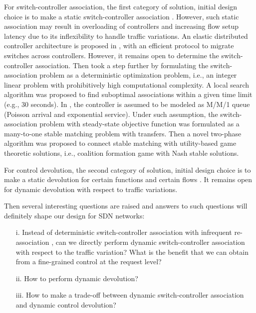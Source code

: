 \documentclass[10pt,journal,compsoc]{IEEEtran}
\begin{document}
For switch-controller association, the first category of solution, initial design choice is to make a static switch-controller association \cite{koponen2010onix} \cite{tootoonchian2010hyperflow}. However, such static association may result in overloading of controllers and increasing flow setup latency due to its inflexibility to handle traffic variations. An elastic distributed controller architecture is proposed in \cite{dixit2013towards}, with an efficient protocol to migrate switches across controllers. However, it remains open to determine the switch-controller association. Then \cite{krishnamurthy2014pratyaastha} took a step further by formulating the switch-association problem as a deterministic optimization problem, i.e., an integer linear problem with prohibitively high computational complexity. A local search algorithm was proposed to find suboptimal associations within a given time limit (e.g., 30 seconds). In \cite{wang2016dynamic}, the controller is assumed to be modeled as M/M/1 queue (Poisson arrival and exponential service). Under such assumption, the switch-association problem with steady-state objective function was formulated as a many-to-one stable matching problem with transfers. Then a novel two-phase algorithm was proposed to connect stable matching with utility-based game theoretic solutions, i.e., coalition formation game with Nash stable solutions.  

For control devolution, the second category of solution, initial design choice is to make a static devolution for certain functions and certain flows \cite{curtis2011devoflow} \cite{hassas2012kandoo}  \cite{zheng2015lazyctrl}. It remains open for dynamic devolution with respect to traffic variations.  

Then several interesting questions are raised and answers to such questions will definitely shape our design for SDN networks:
\begin{itemize}
  \item[i.] Instead of deterministic switch-controller association with infrequent re-association \cite{krishnamurthy2014pratyaastha} \cite{wang2016dynamic}, can we directly perform dynamic switch-controller association with respect to the traffic variation? What is the benefit that we can obtain from a fine-grained control at the request level?
  \item[ii.] How to perform dynamic devolution?
  \item[iii.] How to make a trade-off between dynamic switch-controller association and dynamic control devolution?   
\end{itemize}
\end{document}
